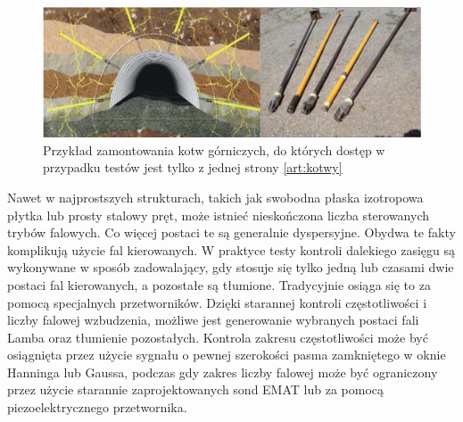 \begin{figure}[h]
\centering
\includegraphics[width=14cm]{Zdjecia/4/kotwy}
\caption{Przykład zamontowania kotw górniczych, do których dostęp w przypadku testów jest tylko z jednej strony \ref{art:kotwy}}
\label{fig:kotwy}
\end{figure}

Nawet w najprostszych strukturach, takich jak swobodna płaska izotropowa płytka lub prosty stalowy pręt, może istnieć nieskończona liczba sterowanych trybów falowych. Co więcej postaci te są generalnie dyspersyjne. Obydwa te fakty komplikują użycie fal kierowanych. W praktyce testy kontroli dalekiego zasięgu są wykonywane w sposób zadowalający, gdy stosuje się tylko jedną lub czasami dwie postaci fal kierowanych, a pozostałe są tłumione. Tradycyjnie osiąga się to za pomocą specjalnych przetworników. Dzięki starannej kontroli częstotliwości i liczby falowej wzbudzenia, możliwe jest generowanie wybranych postaci fali Lamba oraz tłumienie pozostałych. Kontrola zakresu częstotliwości może być osiągnięta przez użycie sygnału o pewnej szerokości pasma zamkniętego w oknie Hanninga lub Gaussa, podczas gdy zakres liczby falowej może być ograniczony przez użycie starannie zaprojektowanych sond EMAT lub za pomocą piezoelektrycznego przetwornika. 

